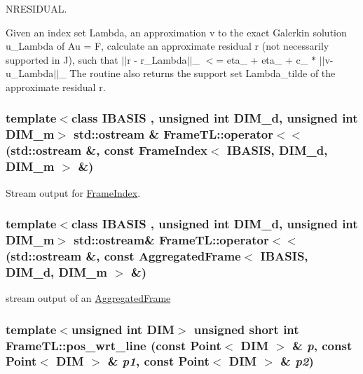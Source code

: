 NRESIDUAL. 

Given an index set Lambda, an approximation v to the exact Galerkin solution u\_\-Lambda of Au = F, calculate an approximate residual r (not necessarily supported in J), such that $|$$|$r - r\_\-Lambda$|$$|$\_ $<$= eta\_ + eta\_ + c\_ $\ast$ $|$$|$v-u\_\-Lambda$|$$|$\_ The routine also returns the support set Lambda\_\-tilde of the approximate residual r. \hypertarget{namespaceFrameTL_4f787a15e5a101207d222e0a799a7e5d}{
\subsubsection[{operator$<$$<$}]{\setlength{\rightskip}{0pt plus 5cm}template$<$class IBASIS , unsigned int DIM\_\-d, unsigned int DIM\_\-m$>$ std::ostream \& FrameTL::operator$<$$<$ (std::ostream \&, \/  const FrameIndex$<$ IBASIS, DIM\_\-d, DIM\_\-m $>$ \&)}}
\label{namespaceFrameTL_4f787a15e5a101207d222e0a799a7e5d}


Stream output for \hyperlink{classFrameTL_1_1FrameIndex}{FrameIndex}. \hypertarget{namespaceFrameTL_218a9a8d5b69562375139a49043fce0b}{
\subsubsection[{operator$<$$<$}]{\setlength{\rightskip}{0pt plus 5cm}template$<$class IBASIS , unsigned int DIM\_\-d, unsigned int DIM\_\-m$>$ std::ostream\& FrameTL::operator$<$$<$ (std::ostream \&, \/  const AggregatedFrame$<$ IBASIS, DIM\_\-d, DIM\_\-m $>$ \&)}}
\label{namespaceFrameTL_218a9a8d5b69562375139a49043fce0b}


stream output of an \hyperlink{classFrameTL_1_1AggregatedFrame}{AggregatedFrame} \hypertarget{namespaceFrameTL_d4045e5ba1e89e5fbdd9084024f16ae0}{
\subsubsection[{pos\_\-wrt\_\-line}]{\setlength{\rightskip}{0pt plus 5cm}template$<$unsigned int DIM$>$ unsigned short int FrameTL::pos\_\-wrt\_\-line (const Point$<$ DIM $>$ \& {\em p}, \/  const Point$<$ DIM $>$ \& {\em p1}, \/  const Point$<$ DIM $>$ \& {\em p2})}}
\label{namespaceFrameTL_d4045e5ba1e89e5fbdd9084024f16ae0}


